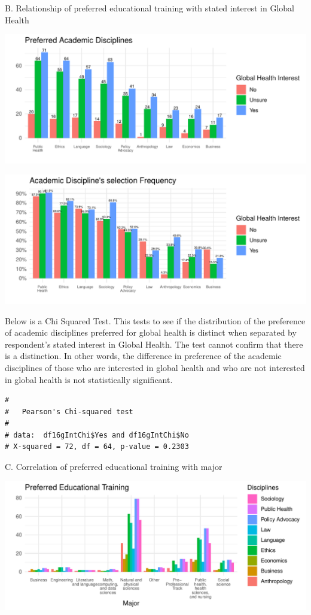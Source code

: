 \documentclass[
  letterpaper,
  DIV=11,
  numbers=noendperiod]{scrartcl}
\begin{document}
\newpage

B. Relationship of preferred educational training with stated interest
in Global Health

\includegraphics{GlobalHealthQuarto1-5_files/figure-pdf/unnamed-chunk-35-1.pdf}

\includegraphics{GlobalHealthQuarto1-5_files/figure-pdf/unnamed-chunk-36-1.pdf}

\newpage

Below is a Chi Squared Test. This tests to see if the distribution of
the preference of academic disciplines preferred for global health is
distinct when separated by respondent's stated interest in Global
Health. The test cannot confirm that there is a distinction. In other
words, the difference in preference of the academic disciplines of those
who are interested in global health and who are not interested in global
health is not statistically significant.

\begin{verbatim}
# 
#   Pearson's Chi-squared test
# 
# data:  df16gIntChi$Yes and df16gIntChi$No
# X-squared = 72, df = 64, p-value = 0.2303
\end{verbatim}

\newpage

C. Correlation of preferred educational training with major

\includegraphics{GlobalHealthQuarto1-5_files/figure-pdf/unnamed-chunk-38-1.pdf}
\end{document}
